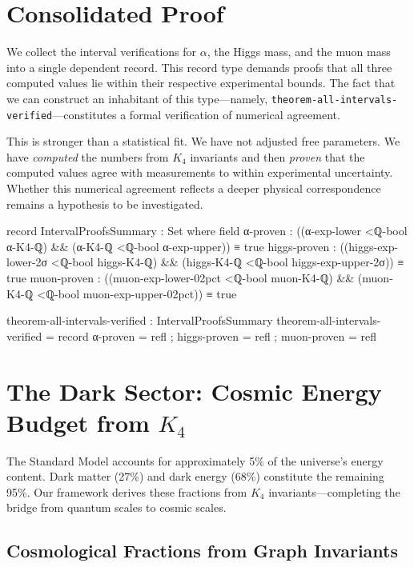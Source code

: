 \documentclass[11pt,a4paper]{book}
\begin{document}
\section{Consolidated Proof}

We collect the interval verifications for $\alpha$, the Higgs mass, and the muon mass into 
a single dependent record. This record type demands proofs that all three computed values lie 
within their respective experimental bounds. The fact that we can construct an inhabitant of 
this type---namely, \texttt{theorem-all-intervals-verified}---constitutes a formal verification 
of numerical agreement.

This is stronger than a statistical fit. We have not adjusted free parameters. We have 
\emph{computed} the numbers from $K_4$ invariants and then \emph{proven} that the computed values 
agree with measurements to within experimental uncertainty. Whether this numerical agreement 
reflects a deeper physical correspondence remains a hypothesis to be investigated.

\begin{code}
record IntervalProofsSummary : Set where
  field
    α-proven : ((α-exp-lower <ℚ-bool α-K4-ℚ) && (α-K4-ℚ <ℚ-bool α-exp-upper)) ≡ true
    higgs-proven : ((higgs-exp-lower-2σ <ℚ-bool higgs-K4-ℚ) && (higgs-K4-ℚ <ℚ-bool higgs-exp-upper-2σ)) ≡ true
    muon-proven : ((muon-exp-lower-02pct <ℚ-bool muon-K4-ℚ) && (muon-K4-ℚ <ℚ-bool muon-exp-upper-02pct)) ≡ true

theorem-all-intervals-verified : IntervalProofsSummary
theorem-all-intervals-verified = record
  { α-proven = refl
  ; higgs-proven = refl
  ; muon-proven = refl
  }
\end{code}

\section{The Dark Sector: Cosmic Energy Budget from $K_4$}
\label{sec:dark-sectors}

The Standard Model accounts for approximately 5\% of the universe's energy content. 
Dark matter (27\%) and dark energy (68\%) constitute the remaining 95\%. 
Our framework derives these fractions from $K_4$ invariants---completing the bridge
from quantum scales to cosmic scales.

\subsection{Cosmological Fractions from Graph Invariants}
\end{document}
